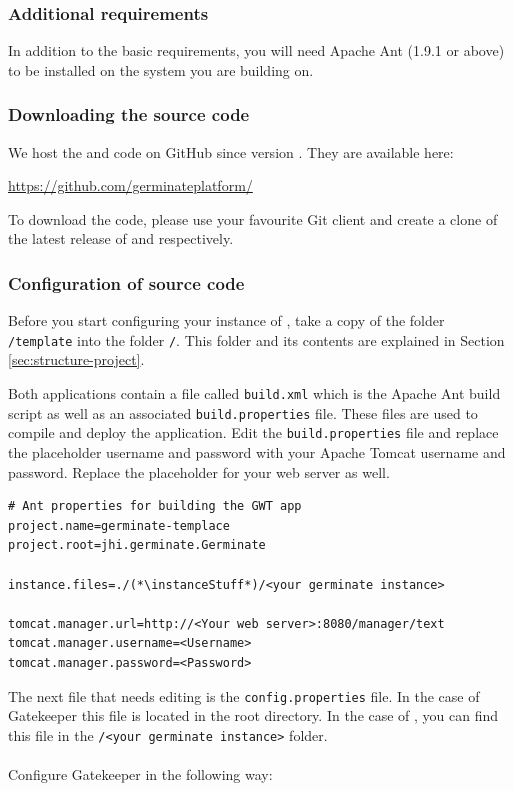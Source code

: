 \subsubsection{Additional requirements}
In addition to the basic requirements, you will need Apache Ant (1.9.1 or above) to be installed on the system you are building {\germinate} on.

\subsubsection{Downloading the source code}
\label{sec:setup:code-download}
We host the {\germinate} and {\gatekeeper} code on GitHub since version \version. They are available here:
\begin{center}
	\url{https://github.com/germinateplatform/}
\end{center}

To download the code, please use your favourite Git client and create a clone of the latest release of {\germinate} and {\gatekeeper} respectively.

\subsubsection{Configuration of source code}
\label{sec:germinate-config}
Before you start configuring your instance of {\germinate}, take a copy of the folder \texttt{\instanceStuff/\allowbreak template} into the folder \texttt{\instanceStuff/}. This folder and its contents are explained in Section \ref{sec:structure-project}.

Both applications contain a file called \texttt{build.xml} which is the Apache Ant build script as well as an associated \texttt{build.properties} file. These files are used to compile and deploy the application. Edit the \texttt{build.properties} file and replace the placeholder username and password with your Apache Tomcat username and password. Replace the placeholder for your web server as well.
\begin{lstlisting}[style=EclipseProperties]
# Ant properties for building the GWT app
project.name=germinate-templace
project.root=jhi.germinate.Germinate

instance.files=./(*\instanceStuff*)/<your germinate instance>

tomcat.manager.url=http://<Your web server>:8080/manager/text
tomcat.manager.username=<Username>
tomcat.manager.password=<Password>
\end{lstlisting}
\noindent
The next file that needs editing is the \texttt{config.properties} file. In the case of Gatekeeper this file is located in the root directory. In the case of {\germinate}, you can find this file in the \texttt{\instanceStuff/<your germinate instance>} folder.\\
\\
Configure Gatekeeper in the following way:

